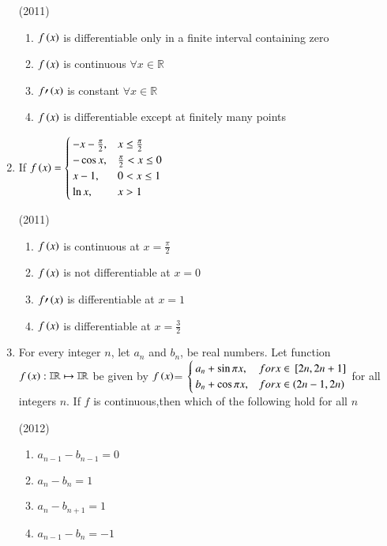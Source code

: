 \documentclass[journal]{IEEEtran}
\numberwithin{equation}{enumi}
\numberwithin{figure}{enumi}
\begin{document}
\begin{enumerate}
    \hfill(2011)
    
    \begin{enumerate}
	\item $f\left(x\right)$ is differentiable only in a finite interval containing zero 
        \item $f\left(x\right)$ is continuous $\forall x\in \mathbb{R}$
	\item $f{\prime}\left(x\right)$ is constant $\forall x\in \mathbb{R}$
        \item $f\left(x\right)$ is differentiable except at finitely many points 
    \end{enumerate}


    \item 
    If $f\left(x\right)= 
    \begin{cases}
        -x-\frac{\pi}{2}, & x\leq \frac{\pi}{2} \\
        -\cos x, & \frac{\pi}{2}<x\leq 0 \\
        x-1, & 0<x\leq1 \\
        \ln x, & x>1
    \end{cases}$ 

    \hfill(2011)
    
    \begin{enumerate}
        \item $f\left(x\right)$ is continuous at $x=\frac{\pi}{2}$
        \item $f\left(x\right)$ is not differentiable at $x=0$
	\item $f{\prime}\left(x\right)$ is differentiable at $x=1$
        \item $f\left(x\right)$ is differentiable at $x=\frac{3}{2}$
    \end{enumerate}

    \item 
    For every integer $n$, let $a_n$ and $b_n$, be real numbers. Let function $f\left(x\right): \mathbb{IR} \mapsto \mathbb{IR}$ be given by
    $f\left(x\right)$= 
    $\begin{cases}
       a_n+\sin\pi x, & for x\in {}\left[2n,2n+1\right] \\
       b_n+\cos\pi x, & for x\in \left(2n-1,2n\right)
    \end{cases}$
    for all integers $n$. If $f$ is continuous,then which of the following hold for all $n$ 

    \hfill(2012)
    
    \begin{enumerate}        
        \item $a_{n-1}-b_{n-1}=0$ 
        \item $a_n-b_n=1$ 
        \item $a_n-b_{n+1}=1$ 
        \item $a_{n-1}-b_n=-1$ 
    \end{enumerate}



\end{enumerate}
\end{document}
